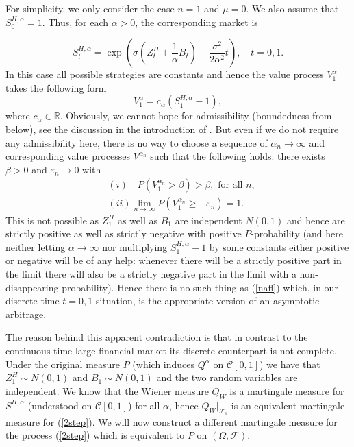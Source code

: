 \documentclass[reqno,a4paper]{amsart}
\theoremstyle{plain}
\theoremstyle{definition}
\theoremstyle{plain}
\theoremstyle{plain}
\theoremstyle{plain}
\begin{document}
For simplicity, we only consider the case $n=1$ and $\mu=0$.
We also assume that $S^{H,\alpha}_0=1$. Thus, for each $\alpha>0$, the corresponding market is

\begin{equation} 
S^{H,\alpha}_t=\exp{\left(\sigma\left(Z^H_t+\frac1{\alpha} B_t\right)-\frac{\sigma^2}{2\alpha^2}t\right)},\quad t=0,1.\label{2step}
\end{equation}
In this case all possible strategies are constants and hence the value process $V^{\alpha}_1$ takes the following form
$$V^{\alpha}_1=c_{\alpha}(S^{H,\alpha}_1-1),$$
where $c_{\alpha}\in\mathbb{R}$. Obviously, we cannot hope for admissibility (boundedness from below), see the discussion in the introduction of \cite{Mi}. But even if we do not require any admissibility here, there is no way to choose a sequence of $\alpha_n\to\infty$ and corresponding value processes $V^{\alpha_n}$ such that the following holds: there exists $\beta>0$ and ${\varepsilon}_n\to0$ with
\begin{align}\label{nafl}
&(i)\quad P(V^{\alpha_n}_1>\beta)>\beta, \text{ for all $n$},\nonumber\\
&(ii) \lim_{n\to\infty}P(V^{\alpha_n}_1\geq -{\varepsilon}_n)=1.
\end{align}
This is not possible as  $Z^{H}_1$ as well as $B_1$ are independent $N(0,1)$ and hence are strictly positive as well as strictly negative with positive $P$-probability (and here neither letting $\alpha\to\infty$ nor multiplying $S^{H,\alpha}_1-1$ by some constants either positive or negative will be of any help: whenever there will be a strictly positive part in the limit there will also be a strictly negative part in the limit with a non-disappearing probability). Hence there is no such thing as (\ref{nafl}) which, in our discrete time $t=0,1$ situation, is the appropriate version
of an asymptotic arbitrage.
 
The reason behind this apparent contradiction is that in contrast to the continuous time large financial market its discrete counterpart is not complete.
Under the original measure $P$ (which induces $Q^{\alpha}$ on $\mathcal{C}[0,1]$) we have that $Z^H_1\sim N(0,1)$ and $B_1\sim N(0,1)$ and the two random variables are independent. We know that the Wiener measure $Q_W$ is a martingale measure for $S^{H,\alpha}$ (understood on $\mathcal{C}[0,1]$) for all $\alpha$, hence $Q_W|_{\mathcal{F}_1}$ is an equivalent martingale measure for (\ref{2step}). We will now construct a different martingale measure for the process (\ref{2step}) which is equivalent to $P$ on $(\Omega,\mathcal{F})$.
\end{document}
